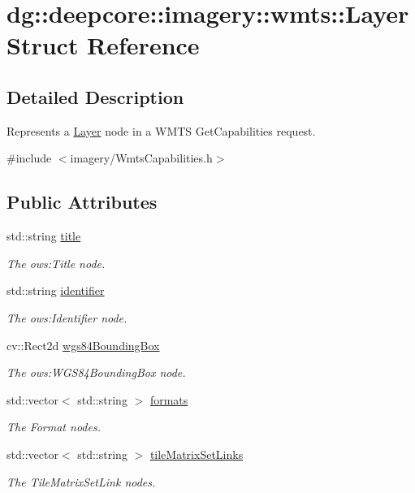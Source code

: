\hypertarget{structdg_1_1deepcore_1_1imagery_1_1wmts_1_1_layer}{}\section{dg\+:\+:deepcore\+:\+:imagery\+:\+:wmts\+:\+:Layer Struct Reference}
\label{structdg_1_1deepcore_1_1imagery_1_1wmts_1_1_layer}


\subsection{Detailed Description}
Represents a \hyperlink{structdg_1_1deepcore_1_1imagery_1_1wmts_1_1_layer}{Layer} node in a W\+M\+TS Get\+Capabilities request. 

{\ttfamily \#include $<$imagery/\+Wmts\+Capabilities.\+h$>$}

\subsection*{Public Attributes}
\begin{DoxyCompactItemize}
\item 
std\+::string \hyperlink{structdg_1_1deepcore_1_1imagery_1_1wmts_1_1_layer_a31a9052e2ccbf947e87c236f94172ceb}{title}
\begin{DoxyCompactList}\small\item\em The ows\+:Title node. \end{DoxyCompactList}\item 
std\+::string \hyperlink{structdg_1_1deepcore_1_1imagery_1_1wmts_1_1_layer_a903488a9e9c3157e8fb371a2f639ace8}{identifier}
\begin{DoxyCompactList}\small\item\em The ows\+:Identifier node. \end{DoxyCompactList}\item 
cv\+::\+Rect2d \hyperlink{structdg_1_1deepcore_1_1imagery_1_1wmts_1_1_layer_aa5965fd52b8132c904f537024885ff88}{wgs84\+Bounding\+Box}
\begin{DoxyCompactList}\small\item\em The ows\+:W\+G\+S84\+Bounding\+Box node. \end{DoxyCompactList}\item 
std\+::vector$<$ std\+::string $>$ \hyperlink{structdg_1_1deepcore_1_1imagery_1_1wmts_1_1_layer_a69d7446036c9e705673b24ef910f3702}{formats}
\begin{DoxyCompactList}\small\item\em The Format nodes. \end{DoxyCompactList}\item 
std\+::vector$<$ std\+::string $>$ \hyperlink{structdg_1_1deepcore_1_1imagery_1_1wmts_1_1_layer_a1b3f111751a740773df1ccb0039e587e}{tile\+Matrix\+Set\+Links}
\begin{DoxyCompactList}\small\item\em The Tile\+Matrix\+Set\+Link nodes. \end{DoxyCompactList}\end{DoxyCompactItemize}


